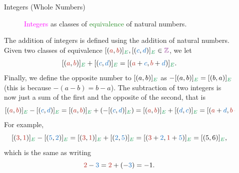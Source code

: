 \documentclass[final]{beamer}
\newlength{\sepwidth}
\newlength{\colwidth}
\newcommand{\separatorcolumn}{\begin{column}{\sepwidth}\end{column}}
\newcommand{\Z}{\mathbb{Z}}
\newcommand{\clr}{\textcolor{BrickRed}}
\newcommand{\clb}{\textcolor{RoyalBlue}}
\newcommand{\clg}{\textcolor{ForestGreen}}
\newcommand{\clm}{\textcolor{Fuchsia}}
\begin{document}
\begin{frame}[t]
\begin{columns}[t]
\begin{column}{\colwidth}
\begin{exampleblock}{Integers (Whole Numbers)}
\begin{figure}[H]
   \caption{\clm{Integers} as classes of \clg{equivalence} of natural numbers.}
   \label{fig:integers}
  \end{figure}
  The \alert{addition} of integers is defined using the addition of natural
  numbers. Given two classes of equivalence $[(\clr{a},\clr{b})]_{\clg{E}},
  [(\clb{c},\clb{d})]_{\clg{E}} \in \clm{\Z}$, we let
  \[
   [(\clr{a},\clr{b})]_{\clg{E}} + [(\clb{c}, \clb{d})]_{\clg{E}} = [(\clr{a} +
   \clb{c}, \clr{b} + \clb{d})]_{\clg{E}}.
  \]
  Finally, we define the \alert{opposite number} to $[(a,b)]_{\clg{E}}$ as
  $-[(a,b)]_{\clg{E}} = [(b,a)]_{\clg{E}}$ (this is because $-(a-b) = b-a$). The
  \alert{subtraction} of two integers is now just a sum of the first and the
  opposite of the second, that is
  \[
   [(\clr{a},\clr{b})]_{\clg{E}} - [(\clb{c},\clb{d})]_{\clg{E}} =
   [(\clr{a},\clr{b})]_{\clg{E}} + (-[(\clb{c},\clb{d})]_{\clg{E}}) =
   [(\clr{a},\clr{b})]_{\clg{E}} + [(\clb{d},\clb{c})]_{\clg{E}} = [(\clr{a} +
   \clb{d}, \clr{b} + \clb{c})]_{\clg{E}}.
  \]
  For example,
  \[
   [(\clr{3}, \clr{1})]_{\clg{E}} - [(\clb{5},\clb{2})]_{\clg{E}} = [(\clr{3},
   \clr{1})]_{\clg{E}} + [(\clb{2},\clb{5})]_{\clg{E}} = [(\clr{3} + \clb{2},
   \clr{1} + \clb{5})]_{\clg{E}} = [(5, 6)]_{\clg{E}},
  \]
  which is the same as writing
  \[
   \clr{2} - \clb{3} = \clr{2} + (-\clb{3}) = -1.
  \]
 \end{exampleblock}

\end{column}

\separatorcolumn

\begin{column}{\colwidth}


\end{column}
\end{columns}
\end{frame}
\end{document}
